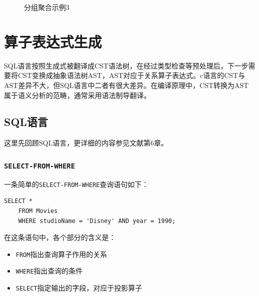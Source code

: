\begin{figure}[H]
    \centering
    \caption{分组聚合示例3}\label{fig:6-example-agv3}
\end{figure}

\section{算子表达式生成}

SQL语言按照生成式被翻译成CST语法树，在经过类型检查等预处理后，下一步需要将CST变换成抽象语法树AST，AST对应于关系算子表达式。c语言的CST与AST差异不大，但SQL语言中二者有很大差异。在编译原理中，CST转换为AST属于语义分析的范畴，通常采用语法制导翻译。

\subsection{SQL语言}

这里先回顾SQL语言，更详细的内容参见文献\cite{Ullman1998A}第6章。

\subsubsection*{\texttt{SELECT-FROM-WHERE}}

一条简单的\texttt{SELECT-FROM-WHERE}查询语句如下：

\begin{lstlisting}[style=verbose]
    SELECT *
    FROM Movies
    WHERE studioName = 'Disney' AND year = 1990;
\end{lstlisting}

在这条语句中，各个部分的含义是：
\begin{itemize}
    \item \texttt{FROM}指出查询算子作用的关系
    \item \texttt{WHERE}指出查询的条件
    \item \texttt{SELECT}指定输出的字段，对应于投影算子
\end{itemize}


